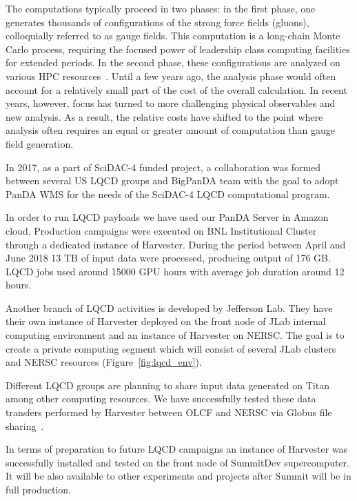 \documentclass{webofc}
\begin{document}
The computations typically proceed in two phases: in the first phase, one generates thousands of configurations of the strong force fields (gluons), colloquially referred to as gauge fields. 
This computation is a long-chain Monte Carlo process, requiring the focused power of leadership class computing facilities for extended periods. In the second phase, these configurations are analyzed on various HPC resources~\cite{Babich:2011np}.
Until a few years ago, the analysis phase would often account for a relatively small part of the cost of the overall calculation. In recent years, however, focus has turned to more challenging physical observables and new analysis. As a result, the relative costs have shifted to the point where analysis often requires an equal or greater amount of computation than gauge field generation.

In 2017, as a part of SciDAC-4 funded project, a collaboration was formed between several US LQCD groups and BigPanDA team with the goal to adopt PanDA WMS for the needs of the SciDAC-4 LQCD computational program.

In order to run LQCD payloads we have used our PanDA Server in Amazon cloud. Production campaigns were executed on BNL Institutional Cluster through a dedicated instance of Harvester. During the period between April and June 2018 13 TB of input data were processed, producing output of 176 GB. LQCD jobs used around 15000 GPU hours with average job duration around 12 hours.

Another branch of LQCD activities is developed by Jefferson Lab. 
They have their own instance of Harvester deployed on the front node of JLab internal computing environment and an instance of Harvester on NERSC. The goal is to create a private computing segment which will consist of several JLab clusters and NERSC resources (Figure~\ref{fig:lqcd_env}).

Different LQCD groups are planning to share input data generated on Titan among other computing resources. We have successfully tested these data transfers performed by Harvester between OLCF and NERSC via Globus file sharing~\cite{Globusdatatransfer}.

In terms of preparation to future LQCD campaigns an instance of Harvester was successfully installed and tested on the front node of SummitDev supercomputer. It will be also available to other experiments and projects after Summit will be in full production.
\end{document}
